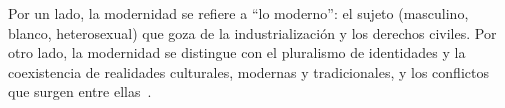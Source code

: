 Por un lado, la modernidad se refiere a ``lo moderno'': el sujeto (masculino, blanco, heterosexual) que goza de la industrialización y los derechos civiles.
Por otro lado, la modernidad se distingue con el pluralismo de identidades y la coexistencia de realidades culturales, modernas y tradicionales, y los conflictos que surgen entre ellas~\autocite[177]{SzIr2009}.


\begin{comment}
# modernidad

* estrechamente vinculada a la idea del progreso (una idea europea); tiene sus raices en:
  * revolución industrial
  * revolución francesa (ideales democráticos y al final no tan democráticos: "todos son iguales pero algunos son más iguales que otros")
  * romanticismo alemán & humanismo
    * (auch interessant dass der Humanismus mit Sklaverei vereinbar war)
  * positivismo científico
* el proyecto/ideal europeo se sobrepone sobre todos los modelos y todos se miden a través de ello
* pluralismo, contradicciones, utopías
* a partir de la ilustración: una interacción de proces históricos, etc en los últimos 5 siglos
* Eurocentrismo: no debido a procesos "naturales", sino a la administración de colonias: recursos naturales, mano de obra
* ruptura con lo que existió antes
* dualidad: coextistencia de lo tradicional y lo moderno \cite{SzIr2009}{p.177}
* otras oposiciones perdurables: "ritual y racionalidad, mito e historia, comunidad y estado, magia y lo moderno, emoción y razón"~\cite{SzIr2009}{p.177} --> Perón versucht an sie alle zu appellieren?
* modernidades

# sujetos modernos

* sujetos de la modernidad vs sujetos modernos ~\cite{SzIr2009}{p.180}
  * sujetos de la modernidad: actores históric@s, participantes activxs en los procesos de la modernidad; sujetxs *a* estos procesos; sujetxs que moldean de manera activa los procesos;  "comprendido no sólo a las clases medias progresivas occidentalizadas, sino a campesinos, indios y trabajadores que de modo diverso hab articulado los procesos de colonialismo y poscolonialismo"
  * sujeto moderno (masculino, europeo/euroamericano, heterosexual, blanco, ...): imaginado por las discuciones y concepciones cotidianas de la modernidad
  * "Los múltiples sujetos modernos [..] son también sujetos de la modernidad, pero no todos los sujetos de la modernidad son sujetos modernos."
* quiénes identidades están privilegiadas? hombre, blanco, europeo, heterosexual..
\end{comment}

